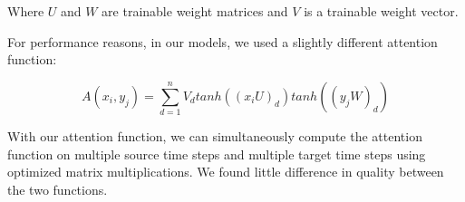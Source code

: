 \documentclass{article}
\begin{document}
Where $U$ and $W$ are trainable weight matrices and $V$ is a trainable weight vector.  

For performance reasons, in our models, we used a slightly different attention function:

\begin{equation}\label{eq:ourattention}
A(x_i, y_j) = \sum_{d=1}^{n}V_d tanh((x_iU)_d) tanh((y_jW)_d)
\end{equation}

With our attention function, we can simultaneously compute the attention function on multiple source time steps and multiple target time steps using optimized matrix multiplications.  We found little difference in quality between the two functions.
\end{document}
